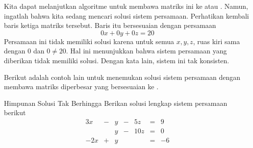 \begin{solution}
Kita dapat melanjutkan algoritme untuk membawa matriks ini ke \ef \;atau \rref. Namun, ingatlah bahwa
kita sedang mencari solusi sistem persamaan. Perhatikan kembali baris ketiga matriks tersebut.
Baris itu bersesuaian dengan
persamaan
\begin{equation*}
0x+0y+0z=20
\end{equation*}
Persamaan ini tidak memiliki solusi karena untuk semua $x,y,z$, ruas kiri sama dengan $0$ dan $0\neq 20.$ Hal ini menunjukkan bahwa
sistem persamaan yang diberikan tidak memiliki solusi. Dengan kata lain, sistem ini tak konsisten.
\end{solution}

Berikut adalah contoh lain untuk menemukan solusi sistem persamaan dengan membawa
matriks diperbesar yang bersesuaian ke \rref.

\begin{example}{Himpunan Solusi Tak Berhingga}\label{exa:infinitesetofsoln}
Berikan solusi lengkap sistem persamaan berikut \:
\begin{equation}
\begin{array}{ccccccccc}
3x&-&y&-&5z&=&9 \\
&&y&-&10z&=&0 \\
-2x&+&y&&&=&-6
\end{array}
\end{equation}
\end{example}

